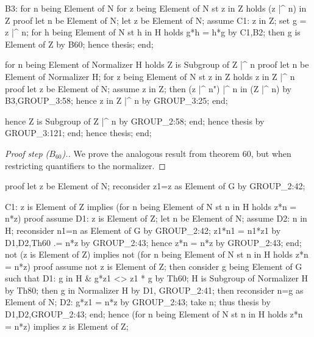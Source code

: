     B3: for n being Element of N
    for z being Element of N st z in Z holds (z |^ n) in Z
    proof
      let n be Element of N;
      let z be Element of N;
      assume C1: z in Z;
      set g = z |^ n;
      for h being Element of N st h in H holds g*h = h*g by C1,B2;
      then g is Element of Z by B60;
      hence thesis;
    end;

    for n being Element of Normalizer H
    holds Z is Subgroup of Z |^ n
    proof
      let n be Element of Normalizer H;
      for z being Element of N st z in Z holds z in Z |^ n
      proof
        let z be Element of N;
        assume z in Z;
        then (z |^ n") |^ n in (Z |^ n) by B3,GROUP_3:58;
        hence z in Z |^ n by GROUP_3:25;
      end;

      hence Z is Subgroup of Z |^ n by GROUP_2:58;
    end;
    hence thesis by GROUP_3:121;
  end;
  hence thesis;
end;
\eatline
{}\nwendcode{}\nwdocspar
\begin{proof}[Proof step ($B_{60}$).]
We prove the analogous result from theorem 60, but when restricting
quantifiers to the normalizer.
\end{proof}

\nwenddocs{}\endmoddef\nwstartdeflinemarkup{}\nwenddeflinemarkup
proof
  let z be Element of N;
  reconsider z1=z as Element of G by GROUP_2:42;

  C1: z is Element of Z implies (for n being Element of N st n in H
                                 holds z*n = n*z)
  proof
    assume D1: z is Element of Z;
    let n be Element of N;
    assume D2: n in H;
    reconsider n1=n as Element of G by GROUP_2:42;
    z1*n1 = n1*z1 by D1,D2,Th60
         .= n*z by GROUP_2:43;
    hence z*n = n*z by GROUP_2:43;
  end;
  not (z is Element of Z) implies not (for n being Element of N st n in H
  holds z*n = n*z)
  proof
    assume not z is Element of Z;
    then consider g being Element of G such that
    D1: g in H & g*z1 <> z1 * g by Th60;
    H is Subgroup of Normalizer H by Th80;
    then g in Normalizer H by D1, GROUP_2:41;
    then reconsider n=g as Element of N;
    D2: g*z1 = n*z by GROUP_2:43;
    take n;
    thus thesis by D1,D2,GROUP_2:43;
  end;
  hence (for n being Element of N st n in H holds z*n = n*z) implies
  z is Element of Z;

